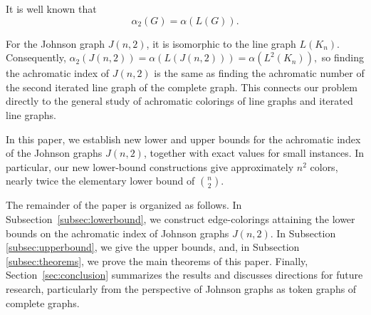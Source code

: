 \documentclass{article}
\newcommand{\blue}[1]{\textcolor{blue}{#1}}
\def\com{\textcolor{purple}}
\begin{document}
It is well known that
$$
\alpha_2(G)=\alpha(L(G)).
$$






For the Johnson graph $J(n,2)$, it is isomorphic to the line graph
$L(K_n)$.
Consequently,
$ \alpha_2(J(n,2)) = \alpha(L(J(n,2))) = \alpha(L^2(K_n)), $ so finding the achromatic index of $J(n,2)$ is the same as finding the 
achromatic number of the second iterated line graph of the complete graph. 
This connects our problem directly to the general study of achromatic 
colorings of line graphs and iterated line graphs.

In this paper, we establish new lower and upper bounds for the achromatic 
index of the Johnson graphs $J(n,2)$, together with exact values for small 
instances. In particular, our new lower-bound constructions give 
approximately $n^2$ colors, nearly twice the elementary lower bound of 
$\binom{n}{2}$.

The remainder of the paper is organized as follows. In Subsection~\ref{subsec:lowerbound}, we construct edge-colorings attaining the lower bounds on the achromatic index of Johnson graphs $J(n,2)$. In Subsection  \ref{subsec:upperbound}, we give the upper bounds, and, in Subsection \ref{subsec:theorems}, we prove the main theorems of this paper. Finally, Section~\ref{sec:conclusion} summarizes the results and discusses directions for future research, particularly from the perspective of Johnson graphs as token graphs of complete graphs.
\end{document}

